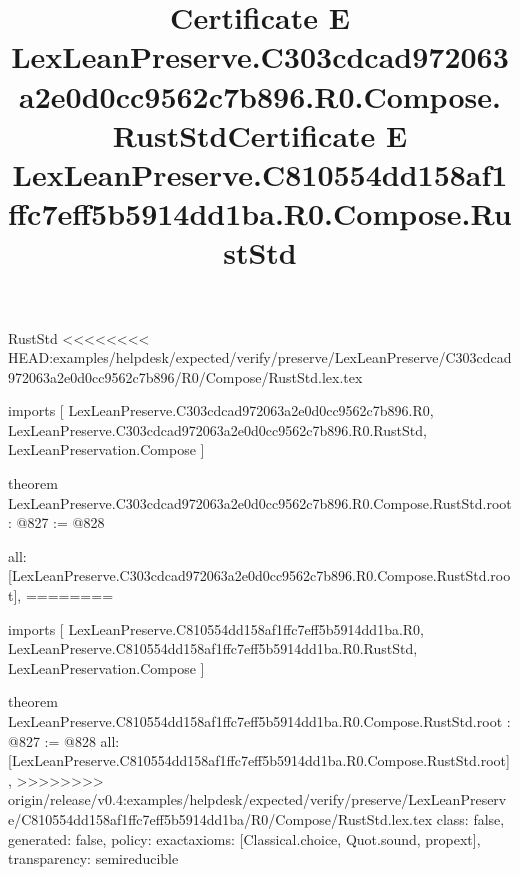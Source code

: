 \begin{lexlean}{RustStd}
<<<<<<<< HEAD:examples/helpdesk/expected/verify/preserve/LexLeanPreserve/C303cdcad972063a2e0d0cc9562c7b896/R0/Compose/RustStd.lex.tex
\title{Certificate E LexLeanPreserve.C303cdcad972063a2e0d0cc9562c7b896.R0.Compose.RustStd}
\begin{coremodule}
imports [
  LexLeanPreserve.C303cdcad972063a2e0d0cc9562c7b896.R0,
  LexLeanPreserve.C303cdcad972063a2e0d0cc9562c7b896.R0.RustStd,
  LexLeanPreservation.Compose
]

theorem LexLeanPreserve.C303cdcad972063a2e0d0cc9562c7b896.R0.Compose.RustStd.root : @827 := @828 {
  all: [LexLeanPreserve.C303cdcad972063a2e0d0cc9562c7b896.R0.Compose.RustStd.root],
========
\title{Certificate E LexLeanPreserve.C810554dd158af1ffc7eff5b5914dd1ba.R0.Compose.RustStd}
\begin{coremodule}
imports [
  LexLeanPreserve.C810554dd158af1ffc7eff5b5914dd1ba.R0,
  LexLeanPreserve.C810554dd158af1ffc7eff5b5914dd1ba.R0.RustStd,
  LexLeanPreservation.Compose
]

theorem LexLeanPreserve.C810554dd158af1ffc7eff5b5914dd1ba.R0.Compose.RustStd.root : @827 := @828 {
  all: [LexLeanPreserve.C810554dd158af1ffc7eff5b5914dd1ba.R0.Compose.RustStd.root],
>>>>>>>> origin/release/v0.4:examples/helpdesk/expected/verify/preserve/LexLeanPreserve/C810554dd158af1ffc7eff5b5914dd1ba/R0/Compose/RustStd.lex.tex
  class: false,
  generated: false,
  policy: exact{axioms: [Classical.choice, Quot.sound, propext]},
  transparency: semireducible
}


\end{coremodule}}
\end{coremodule}
\end{lexlean}
